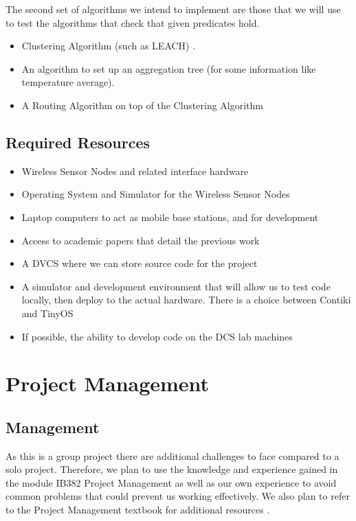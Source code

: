 \documentclass[a4paper]{article}
\begin{document}
The second set of algorithms we intend to implement are those that we will use
to test the algorithms that check that given predicates hold.

\begin{itemize}
	\item Clustering Algorithm (such as LEACH) \cite{herbert2007adaptive}.
	\item An algorithm to set up an aggregation tree (for some information
like temperature average). \cite{TankBible}
	\item A Routing Algorithm on top of the Clustering Algorithm
\end{itemize}

\subsection{Required Resources}
\begin{itemize}
	\item Wireless Sensor Nodes and related interface hardware
	\item Operating System and Simulator for the Wireless Sensor Nodes
	\item Laptop computers to act as mobile base stations, and for development
	\item Access to academic papers that detail the previous work
	\item A DVCS where we can store source code for the project
	\item A simulator and development environment that will allow us to test code locally, then deploy to the actual hardware. There is a choice between Contiki \cite{23839452} and TinyOS \cite{levis2003tossim}
	\item If possible, the ability to develop code on the DCS lab machines
\end{itemize}

\section{Project Management}

\subsection{Management}

As this is a group project there are additional challenges to face compared to a
solo project. Therefore, we plan to use the knowledge and experience gained in
the module IB382 Project Management \cite{IB382} as well as our own experience
to avoid common problems that could prevent us working effectively. We also plan
to refer to the Project Management textbook for additional resources
\cite{PMTextBook}.
\end{document}
